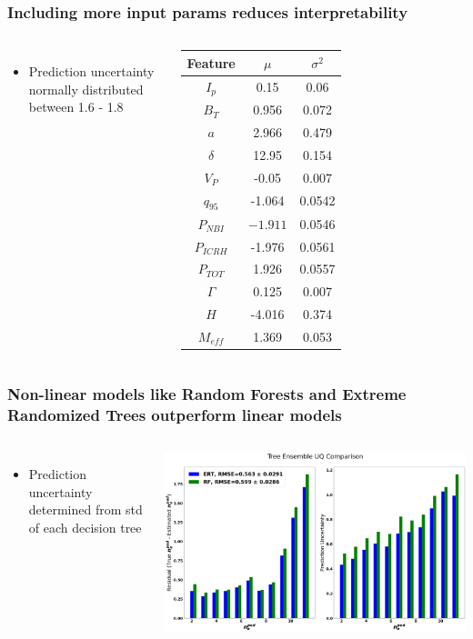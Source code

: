 \documentclass{beamer}
\begin{document}
\begin{frame}
\frametitle{Including more input params reduces interpretability}
\begin{columns}
\begin{itemize}
	\item Prediction uncertainty \\ normally distributed between 1.6 - 1.8
\end{itemize}
\begin{tabular}{ | c | c | c |}
			\hline
			Feature & $\mu$ & $\sigma^2$ \\
			\hline
			$I_p$ & 0.15 & 0.06 \\
			$B_T$ & 0.956 & 0.072 \\
			$a$ & 2.966 & 0.479 \\
			$\delta$ & 12.95 & 0.154 \\
			$V_P$ & -0.05 & 0.007 \\
			$q_{95}$ & -1.064 & 0.0542 \\
			$P_{NBI}$ & $-1.911$ & 0.0546 \\
			$P_{ICRH}$ & -1.976 & 0.0561 \\
			$P_{TOT}$ & 1.926 & 0.0557 \\
			$\Gamma$ & 0.125 & 0.007 \\
			$H$ & -4.016 & 0.374  \\
			$M_{eff}$ & 1.369 & 0.053 \\
			\hline
\end{tabular}
\end{columns}
\end{frame}

\begin{frame}
\frametitle{Non-linear models like Random Forests and Extreme Randomized Trees outperform linear models }

\begin{columns}
\begin{itemize}
	\item Prediction uncertainty determined from std of each decision tree
\end{itemize}
\includegraphics[scale=0.135]{./src/Tree_UQ}
\end{columns}
\end{frame}
\end{document}

